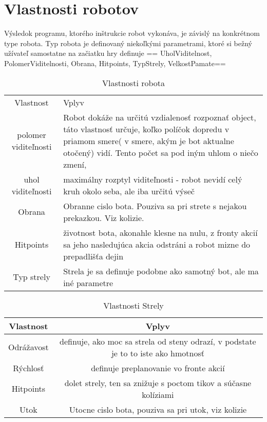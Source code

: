 \section{Vlastnosti robotov}
Výsledok programu, ktorého inštrukcie robot vykonáva, je závislý na konkrétnom type robota. Typ robota je definovaný niekoľkými parametrami, ktoré si bežný užívateľ samostatne na začiatku hry definuje == UholViditelnost, PolomerViditelnosti, Obrana, Hitpoints, TypStrely, VelkostPamate==
\begin{table}[ht]
\caption{Vlastnosti robota}   %
\centering                          %
\begin{tabular}{cl}            %
Vlastnost & Vplyv \\   %
polomer viditeľnosti & Robot dokáže na určitú vzdialenosť rozpoznať object, táto vlastnosť určuje, koľko políčok dopredu v priamom smere( v smere, akým je bot aktualne otočený) vidí. Tento počet sa pod iným uhlom o niečo zmení,\\
uhol viditeľnosti & maximálny rozptyl viditeľnosti - robot nevidí celý kruh okolo seba, ale iba určitú výseč \\
Obrana & Obranne cislo bota. Pouziva sa pri strete s nejakou prekazkou. Viz kolizie. \\
Hitpoints  & životnost bota, akonahle klesne na nulu, z fronty akcií sa jeho nasledujúca akcia odstráni a robot mizne do prepadlišťa dejin\\
Typ strely & Strela je sa definuje podobne ako samotný bot, ale ma iné parametre\\
\end{tabular}
\label{table:vlastnosti}          %
\end{table}

\begin{table}[h]
\caption{Vlastnosti Strely}   %
\centering                          %
\begin{tabular}{cc}            %
\hline\hline                        %
Vlastnost & Vplyv \\   %
\hline                              %
Odrážavost & definuje, ako moc sa strela od steny odrazí, v podstate je to to iste ako hmotnosť\\ \hline
Rýchlosť & definuje preplanovanie vo fronte akcií\\ \hline
Hitpoints  & dolet strely, ten sa znižuje s poctom tikov a súčasne kolíziami\\ \hline
Utok & Utocne cislo bota, pouziva sa pri utok, viz kolizie \\ \hline
\hline                              %
\end{tabular}
\end{table}

